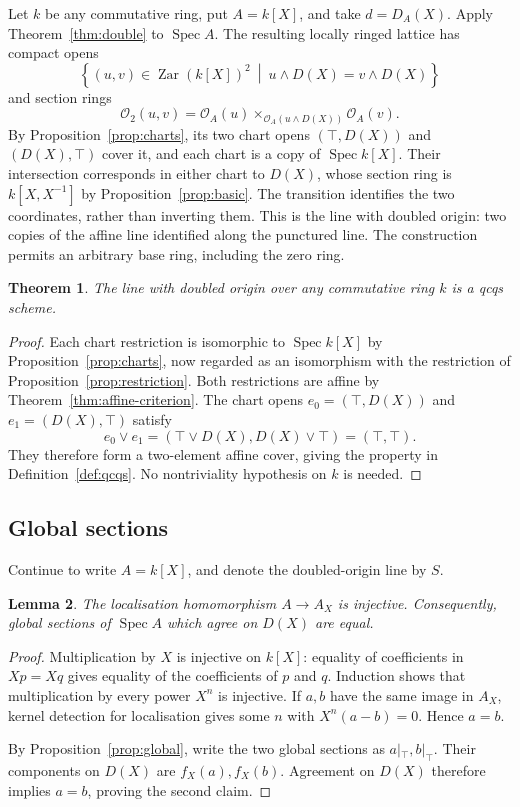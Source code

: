 \documentclass[11pt]{amsart}
\newtheorem{theorem}{Theorem}[section]
\newtheorem{lemma}[theorem]{Lemma}
\theoremstyle{definition}
\theoremstyle{remark}
\newcommand{\Zar}{\operatorname{Zar}}
\newcommand{\Spec}{\operatorname{Spec}}
\newcommand{\OO}{\mathcal O}
\begin{document}
Let $k$ be any commutative ring, put $A=k[X]$, and take
$d=D_A(X)$. Apply Theorem~\ref{thm:double} to $\Spec A$. The resulting
locally ringed lattice has compact opens
\[
 \left\{(u,v)\in\Zar(k[X])^2\ \middle|\
 u\wedge D(X)=v\wedge D(X)\right\}
\]
and section rings
\[
 \OO_2(u,v)=
 \OO_A(u)\times_{\OO_A(u\wedge D(X))}\OO_A(v).
\]
By Proposition~\ref{prop:charts}, its two chart opens
$(\top,D(X))$ and $(D(X),\top)$ cover it, and each chart is a copy of
$\Spec k[X]$. Their intersection corresponds in either chart to
$D(X)$, whose section ring is $k[X,X^{-1}]$ by
Proposition~\ref{prop:basic}. The transition identifies the two
coordinates, rather than inverting them. This is the line with doubled
origin: two copies of the affine line identified along the punctured
line. The construction permits an arbitrary base ring, including the
zero ring.

\begin{theorem}
The line with doubled origin over any commutative ring $k$ is a qcqs
scheme.
\end{theorem}
\begin{proof}
Each chart restriction is isomorphic to $\Spec k[X]$ by
Proposition~\ref{prop:charts}, now regarded as an isomorphism with the
restriction of Proposition~\ref{prop:restriction}. Both restrictions
are affine by Theorem~\ref{thm:affine-criterion}. The chart opens
$e_0=(\top,D(X))$ and $e_1=(D(X),\top)$ satisfy
\[
 e_0\vee e_1=(\top\vee D(X),D(X)\vee\top)=(\top,\top).
\]
They therefore form a two-element affine cover, giving the property in
Definition~\ref{def:qcqs}. No nontriviality hypothesis on $k$ is needed.
\end{proof}

\subsection{Global sections}

Continue to write $A=k[X]$, and denote the doubled-origin line by $S$.

\begin{lemma}\label{lem:punctured-injective}
The localisation homomorphism $A\to A_X$ is injective. Consequently,
global sections of $\Spec A$ which agree on $D(X)$ are equal.
\end{lemma}
\begin{proof}
Multiplication by $X$ is injective on $k[X]$: equality of coefficients
in $Xp=Xq$ gives equality of the coefficients of $p$ and $q$. Induction
shows that multiplication by every power $X^n$ is injective. If $a,b$
have the same image in $A_X$, kernel detection for localisation gives
some $n$ with $X^n(a-b)=0$. Hence $a=b$.

By Proposition~\ref{prop:global}, write the two global sections as
$a|_\top,b|_\top$. Their components on $D(X)$ are $f_X(a),f_X(b)$.
Agreement on $D(X)$ therefore implies $a=b$, proving the second claim.
\end{proof}
\end{document}
